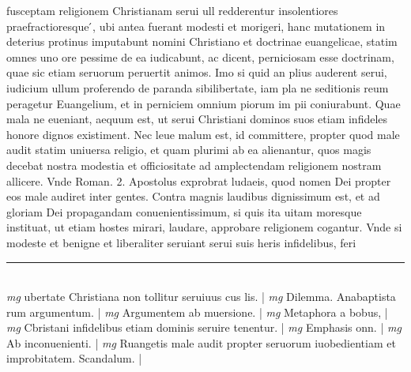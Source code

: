 \documentclass{article}
\begin{document}
\begin{pages}
fusceptam religionem Christianam serui ull redderentur insolentiores praefractioresque ́, ubi antea fuerant modesti et morigeri, hanc mutationem in deterius protinus imputabunt nomini Christiano et doctrinae euangelicae, statim omnes uno ore pessime de ea iudicabunt, ac dicent, perniciosam esse doctrinam, quae sic etiam seruorum peruertit animos. Imo si quid an plius auderent serui, iudicium ullum proferendo de paranda sibilibertate, iam pla ne seditionis reum peragetur Euangelium, et in perniciem omnium piorum im pii coniurabunt. Quae mala ne eueniant, aequum est, ut serui Christiani dominos suos etiam infideles honore dignos existiment. Nec leue malum est, id committere, propter quod male audit statim uniuersa religio, et quam plurimi ab ea alienantur, quos magis decebat nostra modestia et officiositate ad amplectendam religionem nostram allicere. Vnde Roman. 2. Apostolus exprobrat ludaeis, quod nomen Dei propter eos male audiret inter gentes. Contra magnis laudibus dignissimum est, et ad gloriam Dei propagandam conuenientissimum, si quis ita uitam moresque instituat, ut etiam hostes mirari, laudare, approbare religionem cogantur. Vnde si modeste et benigne et liberaliter seruiant serui suis heris infidelibus, feri  \pend
\vspace{0.5cm}\noindent
\vspace{0.2cm}\rule{1cm}{0.2pt}\\ 
\hspace{0.2cm}\textit{mg}
\footnotesize ubertate Christiana non tollitur seruiuus cus lis. 
\normalsize| 
\hspace{0.2cm}\textit{mg}
\footnotesize Dilemma. Anabaptista rum argumentum. 
\normalsize| 
\hspace{0.2cm}\textit{mg}
\footnotesize Argumentem ab muersione. 
\normalsize| 
\hspace{0.2cm}\textit{mg}
\footnotesize Metaphora a bobus, 
\normalsize| 
\hspace{0.2cm}\textit{mg}
\footnotesize Cbristani infidelibus etiam dominis seruire tenentur. 
\normalsize| 
\hspace{0.2cm}\textit{mg}
\footnotesize Emphasis onn. 
\normalsize| 
\hspace{0.2cm}\textit{mg}
\footnotesize Ab inconuenienti. 
\normalsize| 
\hspace{0.2cm}\textit{mg}
\footnotesize Ruangetis male audit propter seruorum iuobedientiam et improbitatem. Scandalum. 
\normalsize| 

\end{pages}
\end{document}
